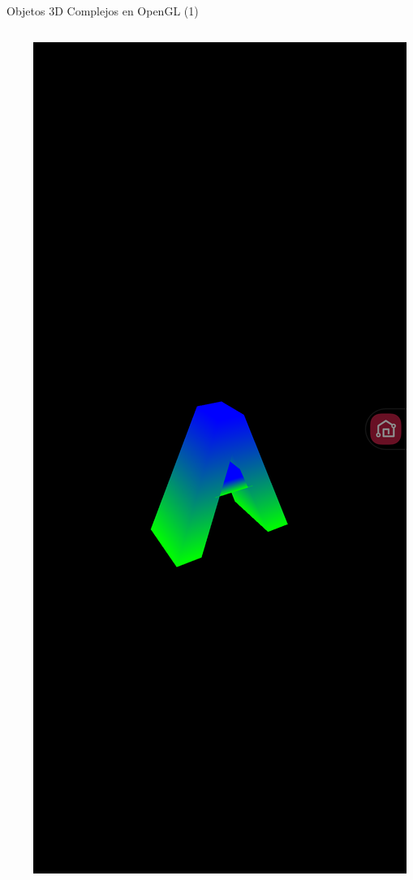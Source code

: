 \documentclass[aspectratio=169,compress]{beamer}
\begin{document}
\begin{frame}{Objetos 3D Complejos en OpenGL (1)}
\begin{columns}
\begin{column}{0.8\textwidth}
\end{column}
\begin{column}{0.2\textwidth}
\begin{center}
\includegraphics[width=1.0\linewidth]{PantallazosDemoTaller/Demo4.png}
\end{center}
\end{column}
\end{columns}


\end{frame}
\end{document}
